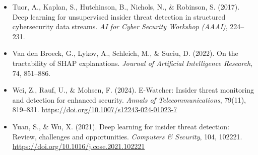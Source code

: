 \documentclass[IB]{TFUOC}%
\begin{document}
\begin{itemize}
    \item Tuor, A., Kaplan, S., Hutchinson, B., Nichols, N., \& Robinson, S. 
    (2017). Deep learning for unsupervised insider threat detection in 
    structured cybersecurity data streams. \textit{AI for Cyber Security 
    Workshop (AAAI)}, 224--231.

    \item Van den Broeck, G., Lykov, A., Schleich, M., \& Suciu, D. (2022). 
    On the tractability of SHAP explanations. \textit{Journal of Artificial 
    Intelligence Research}, 74, 851--886.

    \item Wei, Z., Rauf, U., \& Mohsen, F. (2024). E-Watcher: Insider threat 
    monitoring and detection for enhanced security. \textit{Annals of 
    Telecommunications}, 79(11), 819--831. 
    \url{https://doi.org/10.1007/s12243-024-01023-7}

    \item Yuan, S., \& Wu, X. (2021). Deep learning for insider threat 
    detection: Review, challenges and opportunities. \textit{Computers \& 
    Security}, 104, 102221. 
    \url{https://doi.org/10.1016/j.cose.2021.102221}

\end{itemize}
\end{document}
